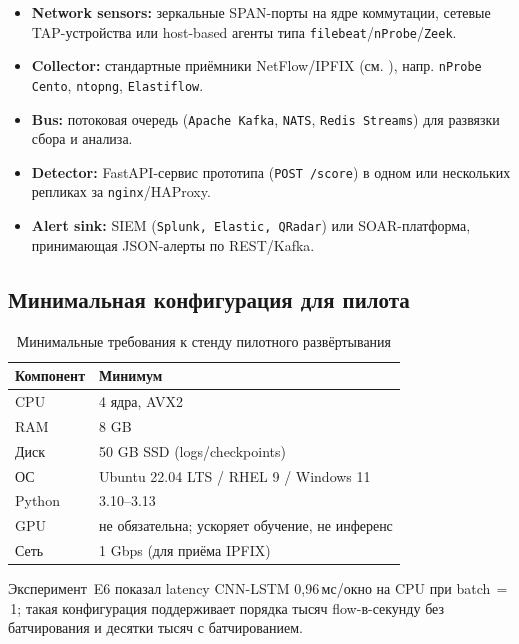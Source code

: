 \documentclass[14pt, a4paper]{extarticle}
\begin{document}
\begin{itemize}
    \item \textbf{Network sensors:} зеркальные SPAN-порты на ядре
    коммутации, сетевые TAP-устройства или host-based агенты типа
    \texttt{filebeat}/\texttt{nProbe}/\texttt{Zeek}.
    \item \textbf{Collector:} стандартные приёмники NetFlow/IPFIX
    (см. \cite{rfc3954, rfc7011}), напр. \texttt{nProbe Cento},
    \texttt{ntopng}, \texttt{Elastiflow}.
    \item \textbf{Bus:} потоковая очередь (\texttt{Apache Kafka},
    \texttt{NATS}, \texttt{Redis Streams}) для развязки сбора и анализа.
    \item \textbf{Detector:} FastAPI-сервис прототипа (\texttt{POST /score})
    в одном или нескольких репликах за \texttt{nginx}/HAProxy.
    \item \textbf{Alert sink:} SIEM (\texttt{Splunk, Elastic, QRadar})
    или SOAR-платформа, принимающая JSON-алерты по REST/Kafka.
\end{itemize}

\subsection{Минимальная конфигурация для пилота}

\begin{table}[H]
\centering
\caption{Минимальные требования к стенду пилотного развёртывания}
\renewcommand{\arraystretch}{1.2}
\begin{tabular}{ll}
\toprule
\textbf{Компонент} & \textbf{Минимум} \\
\midrule
CPU      & 4 ядра, AVX2 \\
RAM      & 8 GB \\
Диск     & 50 GB SSD (logs/checkpoints) \\
ОС       & Ubuntu 22.04 LTS / RHEL 9 / Windows 11 \\
Python   & 3.10--3.13 \\
GPU      & не обязательна; ускоряет обучение, не инференс \\
Сеть     & 1 Gbps (для приёма IPFIX) \\
\bottomrule
\end{tabular}
\end{table}

Эксперимент~E6 показал latency CNN-LSTM 0{,}96\,мс/окно на CPU при
batch\,$=$\,1; такая конфигурация поддерживает порядка тысяч
flow-в-секунду без батчирования и десятки тысяч с батчированием.
\end{document}
